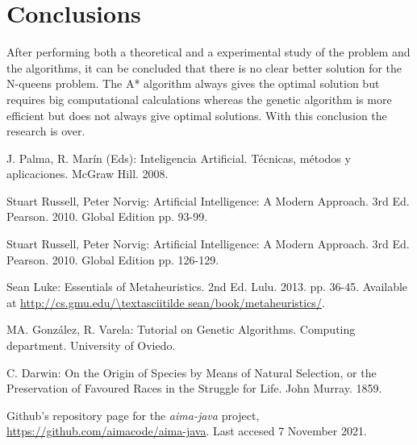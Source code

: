 \documentclass[]{llncs}
\begin{document}
\section{Conclusions}\label{conclusions}
After performing both a theoretical and a experimental study of the problem and the algorithms, it can be concluded that there is no clear better solution for the N-queens problem. The A* algorithm always gives the optimal solution but requires big computational calculations whereas the genetic algorithm is more efficient but does not always give optimal solutions. With this conclusion the research is over.
\begin{thebibliography}{8}
        J. Palma, R. Marín (Eds): Inteligencia Artificial. Técnicas, métodos y aplicaciones. McGraw Hill. 2008.

        Stuart Russell, Peter Norvig: Artificial Intelligence: A Modern Approach. 3rd Ed. Pearson. 2010. Global Edition pp. 93-99.

        Stuart Russell, Peter Norvig: Artificial Intelligence: A Modern Approach. 3rd Ed. Pearson. 2010. Global Edition pp. 126-129.

        Sean Luke: Essentials of Metaheuristics. 2nd Ed. Lulu. 2013. pp. 36-45. Available at \url{http://cs.gmu.edu/\textasciitilde sean/book/metaheuristics/}.

        MA. González, R. Varela: Tutorial on Genetic Algorithms. Computing department. University of Oviedo.

        C. Darwin: On the Origin of Species by Means of Natural Selection, or the Preservation of Favoured Races in the Struggle for Life. John Murray. 1859.

        Github's repository page for the \textit{aima-java} project, \url{https://github.com/aimacode/aima-java}. Last accesed 7 November 2021.
\end{thebibliography}
\end{document}
